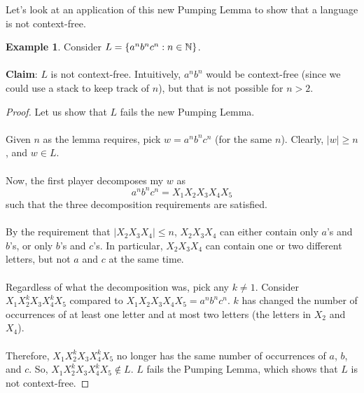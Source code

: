\documentclass[]{article}
\DeclarePairedDelimiter{\set}{\lbrace}{\rbrace}
\theoremstyle{definition}
\newtheorem{ex}{Example}[section]
\begin{document}
        Let's look at an application of this new Pumping Lemma to show that a language is not context-free.
        \begin{ex}
          Consider $L = \set{ a^n b^n c^n : n \in \mathbb{N} }$.
          \\ \\
          \textbf{Claim}: $L$ is not context-free. Intuitively, $a^n b^n$ would be context-free (since we could use a stack to keep track of $n$), but that is not possible for $n > 2$.

          \begin{proof}
            Let us show that $L$ fails the new Pumping Lemma.
            \\ \\
            Given $n$ as the lemma requires, pick $w = a^n b^n c^n$ (for the same $n$). Clearly, $|w| \ge n$, and $w \in L$.
            \\ \\
            Now, the first player decomposes my $w$ as
            $$
              a^n b^n c^n = X_1 X_2 X_3 X_4 X_5
            $$
            such that the three decomposition requirements are satisfied.
            \\ \\
            By the requirement that $|X_2 X_3 X_4| \le n$, $X_2 X_3 X_4$ can either contain only $a$'s and $b$'s, or only $b$'s and $c$'s. In particular, $X_2 X_3 X_4$ can contain one or two different letters, but not $a$ and $c$ at the same time.
            \\ \\
            Regardless of what the decomposition was, pick any $k \ne 1$. Consider $X_1 X_2^k X_3 X_4^k X_5$ compared to $X_1 X_2 X_3 X_4 X_5 = a^n b^n c^n$. $k$ has changed the number of occurrences of at least one letter and at most two letters (the letters in $X_2$ and $X_4$).
            \\ \\
            Therefore, $X_1 X_2^k X_3 X_4^k X_5$ no longer has the same number of occurrences of $a$, $b$, and $c$. So, $X_1 X_2^k X_3 X_4^k X_5 \not \in L$. $L$ fails the Pumping Lemma, which shows that $L$ is not context-free.
          \end{proof}
        \end{ex}
\end{document}
